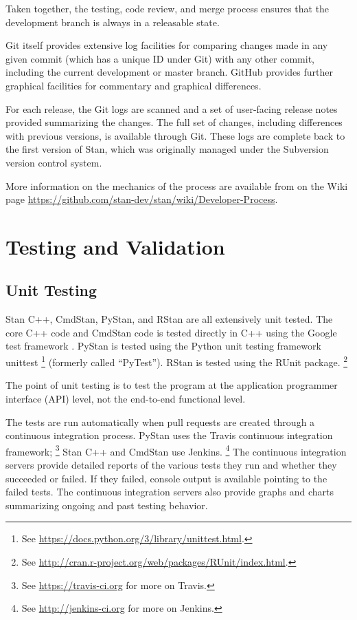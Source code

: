 Taken together, the testing, code review, and merge process ensures
that the development branch is always in a releasable state.

Git itself provides extensive log facilities for comparing changes
made in any given commit (which has a unique ID under Git) with any
other commit, including the current development or master branch.
GitHub provides further graphical facilities for commentary and
graphical differences.

For each release, the Git logs are scanned and a set of user-facing
release notes provided summarizing the changes. The full set of
changes, including differences with previous versions, is available
through Git.  These logs are complete back to the first version of
Stan, which was originally managed under the Subversion version
control system.

More information on the mechanics of the process are available from
on the Wiki page
\url{https://github.com/stan-dev/stan/wiki/Developer-Process}.

\section{Testing and Validation}

\subsection{Unit Testing}

Stan C++, CmdStan, PyStan, and RStan are all extensively unit tested.
The core C++ code and CmdStan code is tested directly in C++ using the
Google test framework \cite{GoogleTest:2011}. PyStan is tested using
the Python unit testing framework unittest%
%
\footnote{See \url{https://docs.python.org/3/library/unittest.html}.}
%
(formerly called ``PyTest'').  RStan is tested using the RUnit package.%
%
\footnote{See
  \url{http://cran.r-project.org/web/packages/RUnit/index.html}.}

The point of unit testing is to test the program at the application
programmer interface (API) level, not the end-to-end functional level.  

The tests are run automatically when pull requests are created through
a continuous integration process. PyStan uses the Travis continuous
integration framework;%
%
\footnote{See \url{https://travis-ci.org} for more on Travis.}
%
Stan C++ and CmdStan use Jenkins.%
%
\footnote{See \url{http://jenkins-ci.org} for more on Jenkins.}
%
The continuous integration servers provide detailed reports of the
various tests they run and whether they succeeded or failed.  If they
failed, console output is available pointing to the failed tests.  The
continuous integration servers also provide graphs and charts
summarizing ongoing and past testing behavior.

